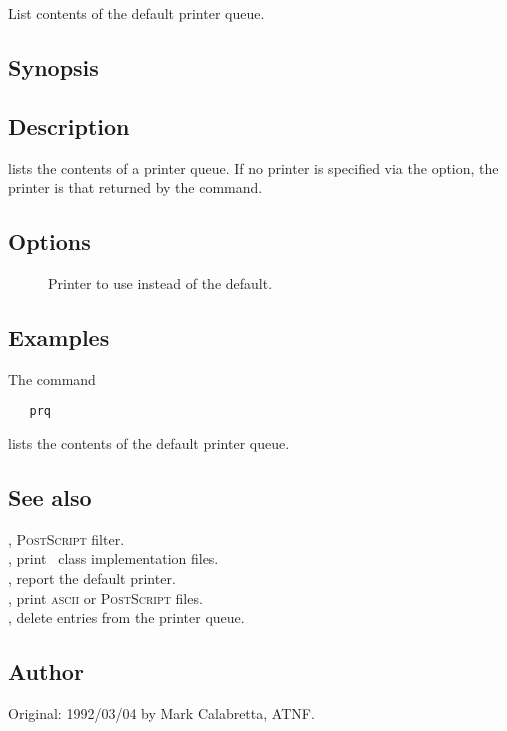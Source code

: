 List contents of the default printer queue.

\subsection*{Synopsis}

\begin{synopsis}
\end{synopsis}

\subsection*{Description}

 lists the contents of a printer queue.  If no printer is specified
via the  option, the printer is that returned by the 
command.

\subsection*{Options}

\begin{description}
\item[]
   Printer to use instead of the default.
\end{description}

\subsection*{Examples}

The command

\begin{verbatim}
   prq
\end{verbatim}

\noindent
lists the contents of the default printer queue.

\subsection*{See also}

, \textsc{PostScript} filter.\\
, print \aipspp\ class implementation files.\\
, report the default printer.\\
, print \textsc{ascii} or \textsc{PostScript} files.\\
, delete entries from the printer queue.

\subsection*{Author}

Original: 1992/03/04 by Mark Calabretta, ATNF.
